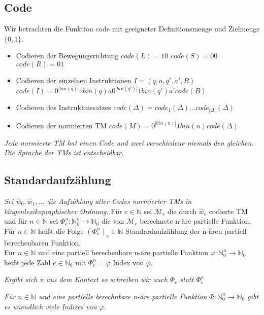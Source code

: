 \subsection{Code}
    Wir betrachten die Funktion code mit geeigneter Definitionsmenge und Zielmenge \(\{0,1\}\).
    \begin{itemize}
        \item Codieren der Bewegungsrichtung
            \subitem \(code(L)=10\)
            \subitem \(code(S)=00\)
            \subitem \(code(R)=01\)
        \item Codieren der einzelnen Instruktionen
            \subitem \(I=(q,a,q',a',B)\)
            \subitem \(code(I)=0^{|bin(q)|}1bin(q)a0^{|bin(q')|}1bin(q')a'code(B)\)
        \item Codieren des Instruktinssatzes 
            \subitem \(code(\Delta)=code_1(\Delta)\dots code_{|\Delta|}(\Delta)\)
        \item Codieren der normierten TM 
            \subitem \(code(M)=0^{|bin(n)|}1bin(n)code(\Delta)\)    
    \end{itemize}
    \textit{Jede normierte TM hat einen Code und zwei verschiedene niemals den gleichen. Die Sprache der TMs ist entscheidbar.}   
\subsection{Standardaufzählung}
    \textit{Sei \(\hat{w}_0,\hat{w}_1,\dots\) die Aufzählung aller Codes normierter TMs in längenlexikopraphischer Ordnung.}\bigskip
    Für \(e\in\mathbb{N}\) sei \(\mathcal{M}_e\) die durch \(\hat{w}_e\) codierte TM und für \(n\in\mathbb{N}\) sei \(\Phi_e^n:\mathbb{N}_0^n\to\mathbb{N}_0\)
    die von \(\mathcal{M}_e\) berechnete n-äre partielle Funktion.\\
    Für \(n\in\mathbb{N}\) heißt die Folge \((\Phi_e^n)_e\in\mathbb{N}\) Standardaufzählung der n-ären partiell berechenbaren Funktion.\\
    Für \(n\in\mathbb{N}\) und eine partiell berechenbare n-äre partielle Funktion \(\varphi:\mathbb{N}_0^n\to\mathbb{N}_0\) heißt jede Zahl 
    \(e\in\mathbb{N}_0\) mit \(\Phi_e^n=\varphi\) Index von \(\varphi\).\par\bigskip
    \textit{Ergibt sich n aus dem Kontext so schreiben wir auch \(\Phi_e\) statt \(\Phi_e^n\)}\par\bigskip
    \textit{Für $n \in \mathbb{N}$ und eine partielle berechnbare n-äre partielle Funktion $\Phi : \mathbb{N}_0^n \rightarrow \mathbb{N}_0$ gibt es unendlich viele Indizes von $\varphi$.}
